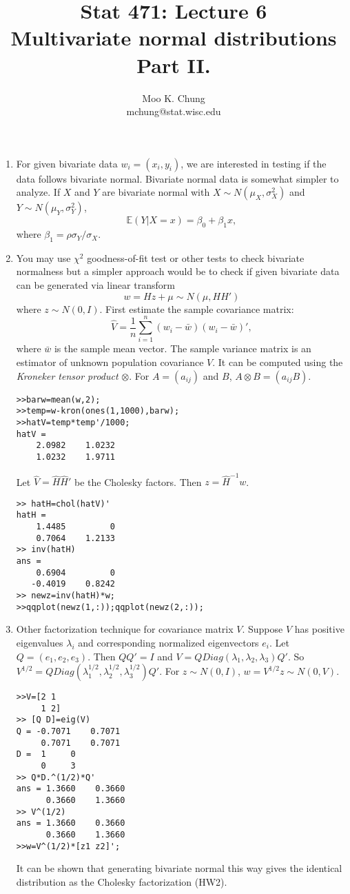 \documentclass[12pt,twocolumn]{article} %
\begin{document}
\title{Stat 471: Lecture 6\\
Multivariate normal distributions Part II.}
\author{Moo K. Chung\\
mchung@stat.wisc.edu}
\maketitle \thispagestyle{empty}

\begin{enumerate}


\item For given bivariate data $w_i=(x_i,y_i)$, we are interested
in testing if the data follows bivariate normal. Bivariate normal
data is somewhat simpler to analyze. If $X$ and $Y$ are bivariate
normal with $X \sim N(\mu_X,\sigma_X^2)$ and $Y \sim
N(\mu_Y,\sigma_Y^2)$,
$$\mathbb{E}(Y|X=x)= \beta_0 + \beta_1x,$$
where $\beta_1=\rho\sigma_Y/\sigma_X$.

\item You may use $\chi^2$ goodness-of-fit test or other tests to
check bivariate normalness but a simpler approach would be to
check if given bivariate data can be generated via linear
transform $$
w=Hz +\mu \sim N(\mu,HH')$$ where $z \sim N(0, I)$.
First estimate the sample covariance matrix:
$$\hat V = \frac{1}{n}\sum_{i=1}^n (w_i - \bar w)(w_i -\bar w)',$$
where $\bar w$ is the sample mean vector. The sample variance
matrix is an estimator of unknown population covariance $V$. It
can be computed using the {\em Kroneker tensor product} $\otimes$.
For $A=(a_{ij})$ and $B$, $A \otimes B = (a_{ij}B)$.
\begin{verbatim}
>>barw=mean(w,2);
>>temp=w-kron(ones(1,1000),barw);
>>hatV=temp*temp'/1000;
hatV =
    2.0982    1.0232
    1.0232    1.9711
\end{verbatim}
Let $\hat V = \hat H \hat H'$ be the Cholesky factors. Then $z =
\hat H^{-1}w$.
\begin{verbatim}
>> hatH=chol(hatV)'
hatH =
    1.4485         0
    0.7064    1.2133
>> inv(hatH)
ans =
    0.6904         0
   -0.4019    0.8242
>> newz=inv(hatH)*w;
>>qqplot(newz(1,:));qqplot(newz(2,:));
\end{verbatim}

\item Other factorization technique for covariance matrix $V$.
Suppose $V$ has positive eigenvalues $\lambda_i$ and corresponding
normalized eigenvectors $e_i$. Let $Q=(e_1,e_2,e_3)$. Then $QQ'=I$
and $V=QDiag(\lambda_1, \lambda_2, \lambda_3)Q'.$ So
$V^{1/2}=QDiag(\lambda_1^{1/2}, \lambda_2^{1/2},
\lambda_3^{1/2})Q'.$ For $z \sim N(0,I)$, $w=V^{1/2}z \sim
N(0,V)$.
\begin{verbatim}
>>V=[2 1
     1 2]
>> [Q D]=eig(V)
Q = -0.7071    0.7071
     0.7071    0.7071
D =  1     0
     0     3
>> Q*D.^(1/2)*Q'
ans = 1.3660    0.3660
      0.3660    1.3660
>> V^(1/2)
ans = 1.3660    0.3660
      0.3660    1.3660
>>w=V^(1/2)*[z1 z2]';
\end{verbatim}
It can be shown that generating bivariate normal this way gives
the identical distribution as the Cholesky factorization (HW2).

\end{enumerate}
\end{document}

